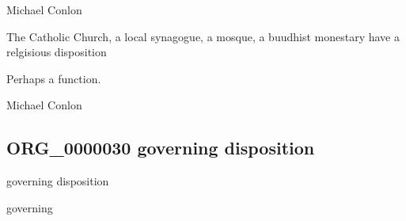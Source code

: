 \documentclass[letterpaper,10pt,english]{sphinxmanual}
\begin{document}
\begin{sphinxShadowBox}

\sphinxAtStartPar
Michael Conlon 
\end{sphinxShadowBox}

\begin{sphinxShadowBox}

\sphinxAtStartPar
The Catholic Church, a local synagogue, a mosque, a buudhist monestary have a relgisious disposition
\end{sphinxShadowBox}

\begin{sphinxShadowBox}

\sphinxAtStartPar
Perhaps a function.
\end{sphinxShadowBox}

\begin{sphinxShadowBox}

\sphinxAtStartPar
Michael Conlon 
\end{sphinxShadowBox}
\begin{quote}

\ignorespaces \end{quote}


\subsection{ORG\_0000030 \sphinxhyphen{} governing disposition}
\label{\detokenize{doc-ORG_0000030:org-0000030-governing-disposition}}\label{\detokenize{doc-ORG_0000030:index-0}}\label{\detokenize{doc-ORG_0000030::doc}}
\begin{sphinxShadowBox}

\sphinxAtStartPar
governing disposition
\end{sphinxShadowBox}

\begin{sphinxShadowBox}

\sphinxAtStartPar
governing
\end{sphinxShadowBox}
\end{document}
